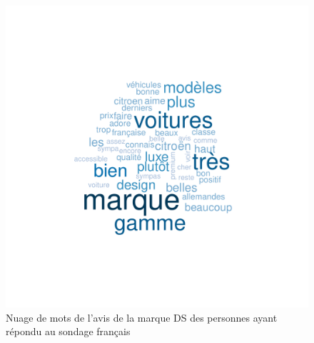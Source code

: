 \documentclass[12pt]{article}\usepackage[]{graphicx}\usepackage[]{color}
\makeatletter
\def\maxwidth{ %
  \ifdim\Gin@nat@width>\linewidth
    \linewidth
  \else
    \Gin@nat@width
  \fi
}
\newenvironment{knitrout}{}{} %
\makeatother
\begin{document}
\begin{knitrout}
\color{fgcolor}\begin{figure}[H]
\includegraphics[width=\maxwidth]{figure/brand_fr-1} \caption[Nuage de mots de l'avis de la marque DS des personnes ayant répondu au sondage français]{Nuage de mots de l'avis de la marque DS des personnes ayant répondu au sondage français}\label{fig:brand fr}
\end{figure}


\end{knitrout}
\end{document}
